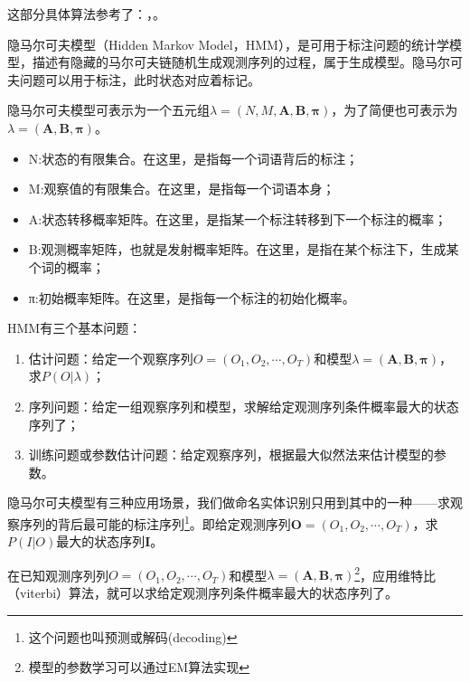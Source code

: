 \documentclass[a4paper,UTF8,no-math]{ctexart}
\begin{document}
	这部分具体算法参考了：\citep{李航2012统计学习方法}，\citep{宗成庆2013统计自然语言处理}。

	
	隐马尔可夫模型（Hidden Markov Model，HMM），是可用于标注问题的统计学模型，描述有隐藏的马尔可夫链随机生成观测序列的过程，属于生成模型。隐马尔可夫问题可以用于标注，此时状态对应着标记。
	
	
	
	隐马尔可夫模型可表示为一个五元组$\lambda=(N,M,\mathbf{A}, \mathbf{B}, \mathbf{\pi})$，为了简便也可表示为$\lambda=(\mathbf{A}, \mathbf{B}, \mathbf{\pi})$。
	
	
	
	\begin{itemize}
		\item N:状态的有限集合。在这里，是指每一个词语背后的标注；
		\item M:观察值的有限集合。在这里，是指每一个词语本身；
		\item A:状态转移概率矩阵。在这里，是指某一个标注转移到下一个标注的概率；
		\item B:观测概率矩阵，也就是发射概率矩阵。在这里，是指在某个标注下，生成某个词的概率；
		\item π:初始概率矩阵。在这里，是指每一个标注的初始化概率。
	\end{itemize}
	
	HMM有三个基本问题：
	
	\begin{enumerate}
		\item 估计问题：给定一个观察序列$O = (O_{1},O_{2}, \cdots ,O_{T})$和模型$\lambda=(\mathbf{A}, \mathbf{B},\mathbf{\pi})$，求$P(O | \lambda)$；
		\item 序列问题：给定一组观察序列和模型，求解给定观测序列条件概率最大的状态序列了；
		\item 训练问题或参数估计问题：给定观察序列，根据最大似然法来估计模型的参数。
	\end{enumerate}
	
	隐马尔可夫模型有三种应用场景，我们做命名实体识别只用到其中的一种——求观察序列的背后最可能的标注序列\footnote{这个问题也叫预测或解码(decoding)}。即给定观测序列$\mathbf{O} = (O_{1},O_{2}, \cdots ,O_{T})$，求$P(I|O)$最大的状态序列$\mathbf{I}$。
	
	在已知观测序列列$O = (O_{1},O_{2}, \cdots ,O_{T})$和模型$\lambda=(\mathbf{A}, \mathbf{B},\mathbf{\pi})$\footnote{模型的参数学习可以通过EM算法实现}，应用维特比（viterbi）算法，就可以求给定观测序列条件概率最大的状态序列了。
	
\end{document}
